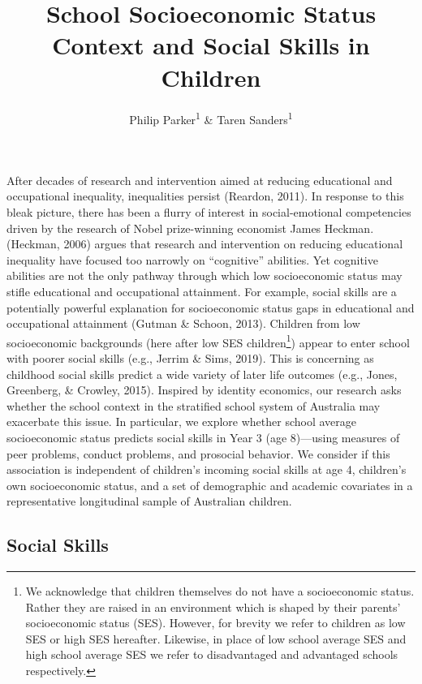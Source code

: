 \documentclass[
  english,
  man]{apa6}
\title{School Socioeconomic Status Context and Social Skills in Children}
\author{Philip Parker\textsuperscript{1} \& Taren Sanders\textsuperscript{1}}
\date{}
\affiliation{\vspace{0.5cm}\textsuperscript{1} Institute for Positive Psychology and Education, Australian Catholic University\\\textsuperscript{2} UCL Institute of Education, UCL}
\begin{document}
\maketitle

After decades of research and intervention aimed at reducing educational and occupational inequality, inequalities persist (Reardon, 2011). In response to this bleak picture, there has been a flurry of interest in social-emotional competencies driven by the research of Nobel prize-winning economist James Heckman. (Heckman, 2006) argues that research and intervention on reducing educational inequality have focused too narrowly on ``cognitive'' abilities. Yet cognitive abilities are not the only pathway through which low socioeconomic status may stifle educational and occupational attainment. For example, social skills are a potentially powerful explanation for socioeconomic status gaps in educational and occupational attainment (Gutman \& Schoon, 2013). Children from low socioeconomic backgrounds (here after low SES children\footnote{We acknowledge that children themselves do not have a socioeconomic status. Rather they are raised in an environment which is shaped by their parents' socioeconomic status (SES). However, for brevity we refer to children as low SES or high SES hereafter. Likewise, in place of low school average SES and high school average SES we refer to disadvantaged and advantaged schools respectively.}) appear to enter school with poorer social skills (e.g., Jerrim \& Sims, 2019). This is concerning as childhood social skills predict a wide variety of later life outcomes (e.g., Jones, Greenberg, \& Crowley, 2015). Inspired by identity economics, our research asks whether the school context in the stratified school system of Australia may exacerbate this issue. In particular, we explore whether school average socioeconomic status predicts social skills in Year 3 (age 8)---using measures of peer problems, conduct problems, and prosocial behavior. We consider if this association is independent of children's incoming social skills at age 4, children's own socioeconomic status, and a set of demographic and academic covariates in a representative longitudinal sample of Australian children.

\hypertarget{social-skills}{%
\subsection{Social Skills}\label{social-skills}}
\end{document}
